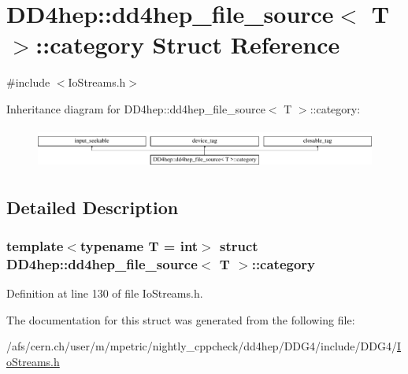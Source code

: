 \hypertarget{struct_d_d4hep_1_1dd4hep__file__source_1_1category}{}\section{D\+D4hep\+:\+:dd4hep\+\_\+file\+\_\+source$<$ T $>$\+:\+:category Struct Reference}
\label{struct_d_d4hep_1_1dd4hep__file__source_1_1category}


{\ttfamily \#include $<$Io\+Streams.\+h$>$}

Inheritance diagram for D\+D4hep\+:\+:dd4hep\+\_\+file\+\_\+source$<$ T $>$\+:\+:category\+:\begin{figure}[H]
\begin{center}
\leavevmode
\includegraphics[height=1.377614cm]{struct_d_d4hep_1_1dd4hep__file__source_1_1category}
\end{center}
\end{figure}


\subsection{Detailed Description}
\subsubsection*{template$<$typename T = int$>$\newline
struct D\+D4hep\+::dd4hep\+\_\+file\+\_\+source$<$ T $>$\+::category}



Definition at line 130 of file Io\+Streams.\+h.



The documentation for this struct was generated from the following file\+:\begin{DoxyCompactItemize}
\item 
/afs/cern.\+ch/user/m/mpetric/nightly\+\_\+cppcheck/dd4hep/\+D\+D\+G4/include/\+D\+D\+G4/\hyperlink{_io_streams_8h}{Io\+Streams.\+h}\end{DoxyCompactItemize}
